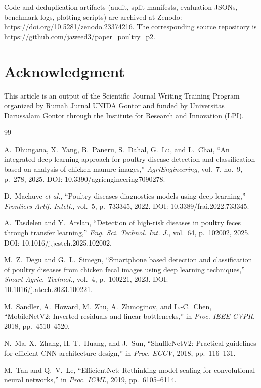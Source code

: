 \documentclass[conference,a4paper]{IEEEtran}
\begin{document}
Code and deduplication artifacts (audit, split manifests, evaluation JSONs, benchmark logs, plotting scripts) are archived at Zenodo: \url{https://doi.org/10.5281/zenodo.23374216}. The corresponding source repository is \url{https://github.com/jaweed3/paper_poultry_p2}.

\section*{Acknowledgment}
This article is an output of the Scientific Journal Writing Training Program organized by Rumah Jurnal UNIDA Gontor and funded by Universitas Darussalam Gontor through the Institute for Research and Innovation (LPI).

\begin{thebibliography}{99}

A.~Dhungana, X.~Yang, B.~Paneru, S.~Dahal, G.~Lu, and L.~Chai, ``An integrated deep learning approach for poultry disease detection and classification based on analysis of chicken manure images,'' \emph{AgriEngineering}, vol.~7, no.~9, p.~278, 2025. DOI: 10.3390/agriengineering7090278.

D.~Machuve \textit{et al.}, ``Poultry diseases diagnostics models using deep learning,'' \emph{Frontiers Artif. Intell.}, vol.~5, p.~733345, 2022. DOI: 10.3389/frai.2022.733345.

A.~Tasdelen and Y.~Arslan, ``Detection of high-risk diseases in poultry feces through transfer learning,'' \emph{Eng. Sci. Technol. Int. J.}, vol.~64, p.~102002, 2025. DOI: 10.1016/j.jestch.2025.102002.

M.~Z.~Degu and G.~L.~Simegn, ``Smartphone based detection and classification of poultry diseases from chicken fecal images using deep learning techniques,'' \emph{Smart Agric. Technol.}, vol.~4, p.~100221, 2023. DOI: 10.1016/j.atech.2023.100221.

M.~Sandler, A.~Howard, M.~Zhu, A.~Zhmoginov, and L.-C.~Chen, ``MobileNetV2: Inverted residuals and linear bottlenecks,'' in \emph{Proc. IEEE CVPR}, 2018, pp.~4510--4520.

N.~Ma, X.~Zhang, H.-T.~Huang, and J.~Sun, ``ShuffleNetV2: Practical guidelines for efficient CNN architecture design,'' in \emph{Proc. ECCV}, 2018, pp.~116--131.

M.~Tan and Q.~V.~Le, ``EfficientNet: Rethinking model scaling for convolutional neural networks,'' in \emph{Proc. ICML}, 2019, pp.~6105--6114.


\end{thebibliography}
\end{document}
